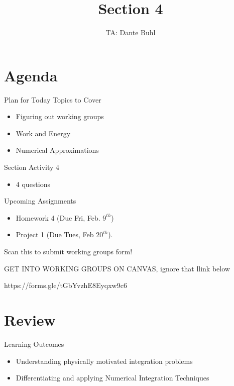 \documentclass{beamer}
\title{Section 4}
\author{TA: Dante Buhl}
\institute{UCSC Math-19B}
\begin{document}
\newcommand{\bmp}[1]{\begin{minipage}{#1\textwidth}}
\newcommand{\emp}{\end{minipage}}


\frame{\titlepage}

\section{Agenda}
\begin{frame}{Plan for Today}
    Topics to Cover
    \begin{itemize}
        \item Figuring out working groups
        \item Work and Energy
        \item Numerical Approximations
    \end{itemize}
    Section Activity 4
    \begin{itemize}
        \item 4 questions
    \end{itemize}
    Upcoming Assignments
    \begin{itemize}
        \item Homework 4 (Due Fri, Feb. $9^{th}$)
        \item Project 1 (Due Tues, Feb $20^{th}$).
    \end{itemize}
\end{frame}


\begin{frame}{Scan this to submit working groups form!}

    GET INTO WORKING GROUPS ON CANVAS, ignore that llink below


    https://forms.gle/tGbYvzhE8Eyqxw9c6

\end{frame}

\section{Review}
\begin{frame}{Learning Outcomes}
    \begin{itemize}
        \item Understanding physically motivated integration problems
        \item Differentiating and applying Numerical Integration Techniques
    \end{itemize}
\end{frame}
\end{document}
